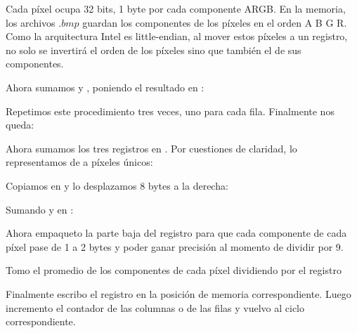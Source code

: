 Cada píxel ocupa 32 bits, 1 byte por cada componente ARGB. En la memoria, los archivos $.bmp$ guardan los componentes de los píxeles en el orden A B G R.
Como la arquitectura Intel es little-endian, al mover estos píxeles a un registro, no solo se invertirá el orden de los píxeles sino que también el de sus componentes.



Ahora sumamos  y , poniendo el resultado en :


Repetimos este procedimiento tres veces, uno para cada fila. Finalmente nos queda:




Ahora sumamos los tres registros en . Por cuestiones de claridad, lo representamos de a píxeles únicos:


Copiamos  en  y lo desplazamos 8 bytes a la derecha:


Sumando  y  en :


Ahora empaqueto la parte baja del registro para que cada componente de cada píxel pase de 1 a 2 bytes y poder ganar precisión al momento de dividir por 9.


Tomo el promedio de los componentes de cada píxel dividiendo por el registro



Finalmente escribo el registro en la posición de memoria correspondiente. Luego incremento el contador de las columnas o de las filas y vuelvo al ciclo correspondiente.


